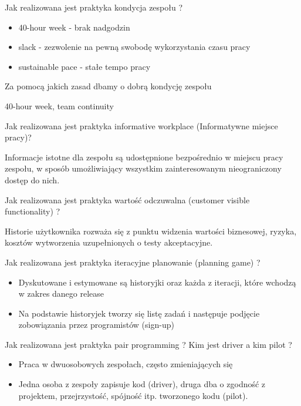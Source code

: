 \documentclass[a4paper,15pt]{article}
\newcommand{\question}[2]{
    \begin{tcolorbox}[colback=mRed!5!white,colframe=mRed,title={Kolokwium 2018 #1}]
        #2
    \end{tcolorbox}
}
\begin{document}
\begin{framed}
Jak realizowana jest praktyka kondycja zespołu ?
\end{framed}
\begin{itemize}
\item 40-hour week - brak nadgodzin
\item slack - zezwolenie na pewną swobodę wykorzystania czasu pracy
\item sustainable pace - stałe tempo pracy
\end{itemize}

\question{}{
Za pomocą jakich zasad dbamy o dobrą kondycję zespołu 
}

\question{}{
40-hour week, team continuity 
}

\begin{framed}
Jak realizowana jest praktyka informative workplace (Informatywne miejsce pracy)?
\end{framed}
Informacje istotne dla zespołu są udostępnione bezpośrednio w miejscu pracy zespołu, w sposób umożliwiający wszystkim zainteresowanym nieograniczony dostęp do nich.

\begin{framed}
Jak realizowana jest praktyka wartość odczuwalna (customer visible functionality) ?
\end{framed}
Historie użytkownika rozważa się z punktu widzenia wartości biznesowej, ryzyka, kosztów wytworzenia uzupełnionych o testy akceptacyjne.

\begin{framed}
Jak realizowana jest praktyka iteracyjne planowanie (planning game) ?
\end{framed}
\begin{itemize}
\item Dyskutowane i estymowane są historyjki oraz każda z iteracji, które wchodzą w zakres danego release
\item Na podstawie historyjek tworzy się listę zadań i następuje podjęcie zobowiązania przez programistów (sign-up)
\end{itemize}

\begin{framed}
Jak realizowana jest praktyka pair programming ? Kim jest driver a kim pilot ?
\end{framed}
\begin{itemize}
\item Praca w dwuosobowych zespołach, często zmieniających się
\item Jedna osoba z zespoły zapisuje kod (driver), druga dba o zgodność z projektem, przejrzystość, spójność itp. tworzonego kodu (pilot).
\end{itemize}
\end{document}
